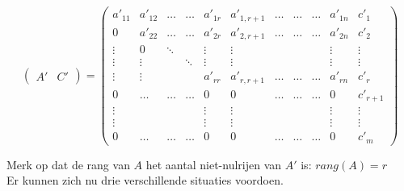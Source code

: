 \[ \left( \begin{array}{c|c} A' & C' \end{array} \right) = 
\left(
\begin{array}{cccccccccc|c}
a'_{11} & a'_{12} & \ldots & \ldots & a'_{1r} & a'_{1,r+1} & \ldots & \ldots & \ldots & a'_{1n} & c'_{1} \\
0 & a'_{22} & \ldots & \ldots & a'_{2r} & a'_{2,r+1} & \ldots & \ldots & \ldots & a'_{2n} & c'_{2} \\
\vdots & 0 & \ddots &  & \vdots & \vdots & & & & \vdots & \vdots \\
\vdots & \vdots & & \ddots & \vdots & \vdots & & & & \vdots & \vdots \\
\vdots & \vdots & & & a'_{rr} & a'_{r,r+1} & \ldots & \ldots & \ldots & a'_{rn} & c'_{r} \\
0 & \ldots & \ldots & \ldots & 0 & 0 & \ldots & \ldots & \ldots & 0 & c'_{r+1} \\
\vdots & & & & \vdots & \vdots & & & & \vdots & \vdots \\
\vdots & & & & \vdots & \vdots & & & & \vdots & \vdots \\
0 & \ldots & \ldots & \ldots & 0 & 0 & \ldots & \ldots & \ldots & 0 & c'_{m} 
\end{array} 
\right) 
\]

Merk op dat de rang van $A$ het aantal niet-nulrijen van $A'$ is: $rang(A)=r$ \\

Er kunnen zich nu drie verschillende situaties voordoen.

